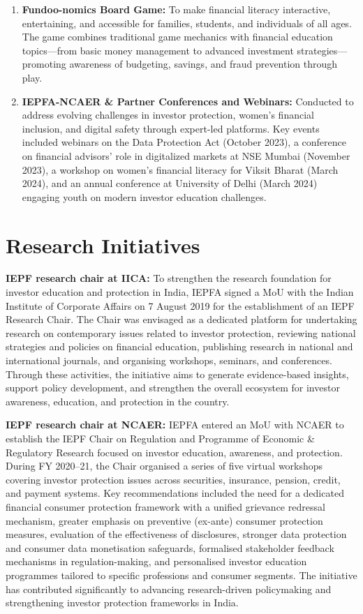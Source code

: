 \documentclass[openany]{book}
\begin{document}
\begin{enumerate}
    \item \textbf{Fundoo-nomics Board Game:} To make financial literacy interactive, entertaining, and accessible for families, students, and individuals of all ages. The game combines traditional game mechanics with financial education topics—from basic money management to advanced investment strategies—promoting awareness of budgeting, savings, and fraud prevention through play.
    \item \textbf{IEPFA-NCAER \& Partner Conferences and Webinars:} Conducted to address evolving challenges in investor protection, women's financial inclusion, and digital safety through expert-led platforms. Key events included webinars on the Data Protection Act (October 2023), a conference on financial advisors' role in digitalized markets at NSE Mumbai (November 2023), a workshop on women's financial literacy for Viksit Bharat (March 2024), and an annual conference at University of Delhi (March 2024) engaging youth on modern investor education challenges.
\end{enumerate}

\section{Research Initiatives} \cite{iepfa_annual_reports}

\noindent \textbf{IEPF research chair at IICA:} To strengthen the research foundation for investor education and protection in India, IEPFA signed a MoU with the Indian Institute of Corporate Affairs on 7 August 2019 for the establishment of an IEPF Research Chair. The Chair was envisaged as a dedicated platform for undertaking research on contemporary issues related to investor protection, reviewing national strategies and policies on financial education, publishing research in national and international journals, and organising workshops, seminars, and conferences. Through these activities, the initiative aims to generate evidence-based insights, support policy development, and strengthen the overall ecosystem for investor awareness, education, and protection in the country. 

\vspace{1em}
\noindent \textbf{IEPF research chair at NCAER:} IEPFA entered an MoU with NCAER to establish the IEPF Chair on Regulation and Programme of Economic \& Regulatory Research focused on investor education, awareness, and protection. During FY 2020–21, the Chair organised a series of five virtual workshops covering investor protection issues across securities, insurance, pension, credit, and payment systems. Key recommendations included the need for a dedicated financial consumer protection framework with a unified grievance redressal mechanism, greater emphasis on preventive (ex-ante) consumer protection measures, evaluation of the effectiveness of disclosures, stronger data protection and consumer data monetisation safeguards, formalised stakeholder feedback mechanisms in regulation-making, and personalised investor education programmes tailored to specific professions and consumer segments. The initiative has contributed significantly to advancing research-driven policymaking and strengthening investor protection frameworks in India. 
\end{document}
